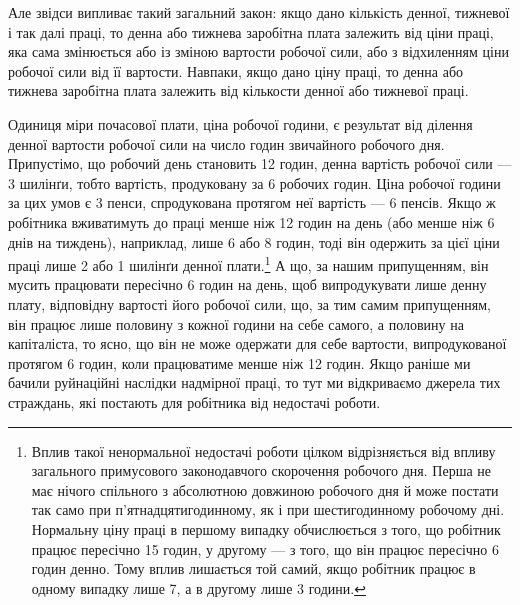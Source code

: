 Але звідси випливає такий загальний закон: якщо дано кількість
денної, тижневої і так далі праці, то денна або тижнева
заробітна плата залежить від ціни праці, яка сама змінюється
або із зміною вартости робочої сили, або з відхиленням ціни робочої
сили від її вартости. Навпаки, якщо дано ціну праці, то денна
або тижнева заробітна плата залежить від кількости денної або
тижневої праці.

Одиниця міри почасової плати, ціна робочої години, є результат
від ділення денної вартости робочої сили на число годин звичайного
робочого дня. Припустімо, що робочий день становить
12 годин, денна вартість робочої сили — 3 шилінґи, тобто вартість,
продуковану за 6 робочих годин. Ціна робочої години за
цих умов є 3 пенси, спродукована протягом неї вартість — 6 пенсів.
Якщо ж робітника вживатимуть до праці менше ніж 12 годин
на день (або менше ніж 6 днів на тиждень), наприклад, лише
6 або 8 годин, тоді він одержить за цієї ціни праці лише 2 або
1 шилінґи денної плати.\footnote{
Вплив такої ненормальної недостачі роботи цілком відрізняється
від впливу загального примусового законодавчого скорочення робочого
дня. Перша не має нічого спільного з абсолютною довжиною робочого
дня й може постати так само при п’ятнадцятигодинному, як і при шестигодинному
робочому дні. Нормальну ціну праці в першому випадку обчислюється
з того, що робітник працює пересічно 15 годин, у другому — з
того, що він працює пересічно 6 годин денно. Тому вплив лишається той
самий, якщо робітник працює в одному випадку лише 7, а в другому
лише 3 години.
} А що, за нашим припущенням, він
мусить працювати пересічно 6 годин на день, щоб випродукувати
лише денну плату, відповідну вартості його робочої сили, що,
за тим самим припущенням, він працює лише половину з кожної
години на себе самого, а половину на капіталіста, то ясно, що
він не може одержати для себе вартости, випродукованої протягом
6 годин, коли працюватиме менше ніж 12 годин. Якщо раніше
ми бачили руйнаційні наслідки надмірної праці, то тут ми відкриваємо
джерела тих страждань, які постають для робітника від
недостачі роботи.

